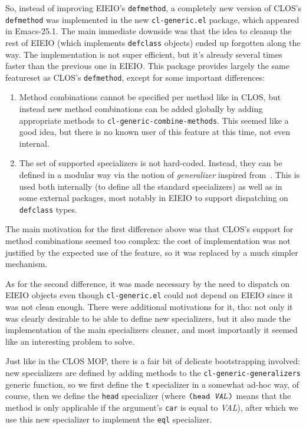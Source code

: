 \documentclass[format=acmsmall, review=false, screen=true]{acmart}
\begin{document}
So, instead of improving EIEIO's \texttt{defmethod}, a completely new
version of CLOS's \texttt{defmethod} was implemented in the new
\texttt{cl-generic.el} package, which appeared in Emacs-25.1.  The main
immediate downside was that the idea to cleanup the rest of EIEIO (which
implements \texttt{defclass} objects) ended up forgotten along the way.
The implementation is not super efficient, but it's already several times
faster than the previous one in EIEIO.  This package provides largely the
same featureset as CLOS's \texttt{defmethod}, except for some important
differences:
\begin{enumerate}
\item Method combinations cannot be specified per method like in CLOS, but
  instead new method combinations can be added globally by adding
  appropriate methods to \texttt{cl-generic-combine-methods}.  This seemed
  like a good idea, but there is no known user of this feature at this time,
  not even internal.
\item The set of supported specializers is not hard-coded.  Instead, they
  can be defined in a modular way via the notion of \emph{generalizer}
  inspired from~\cite{Rhodes14}.  This is used both internally (to define
  all the standard specializers) as well as in some external packages, most
  notably in EIEIO to support dispatching on \texttt{defclass} types.
\end{enumerate}
The main motivation for the first difference above was that CLOS's support
for method combinations seemed too complex: the cost of implementation was
not justified by the expected use of the feature, so it was replaced by
a much simpler mechanism.

As for the second difference, it was made necessary by the need to dispatch
on EIEIO objects even though \texttt{cl-generic.el} could not depend on
EIEIO since it was not clean enough.  There were additional motivations for
it, tho: not only it was clearly desirable to be able to define new
specializers, but it also made the implementation of the main specializers
cleaner, and most importantly it seemed like an interesting problem
to solve.

Just like in the CLOS MOP, there is a fair bit of delicate bootstrapping
involved: new specializers are defined by adding methods to the
\texttt{cl-generic-generalizers} generic function, so we first define the
\texttt{t} specializer in a somewhat ad-hoc way, of course, then we define
the \texttt{head} specializer (where $\texttt{(head \textsl{VAL})}$ means
that the method is only applicable if the argument's \texttt{car} is equal
to \textsl{VAL}), after which we use this new specializer to implement the
\texttt{eql} specializer.
\end{document}
